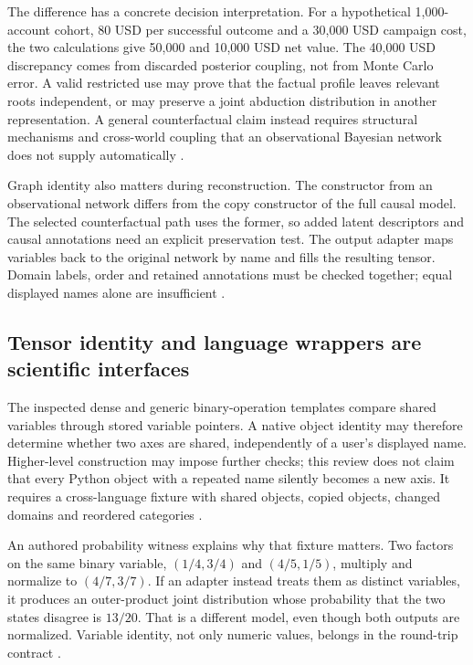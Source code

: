The difference has a concrete decision interpretation. For a hypothetical
1,000-account cohort, 80 USD per successful outcome and a 30,000 USD
campaign cost, the two calculations give 50,000 and 10,000 USD net value.
The 40,000 USD discrepancy comes from discarded posterior coupling, not
from Monte Carlo error. A valid restricted use may prove that the factual
profile leaves relevant roots independent, or may preserve a joint
abduction distribution in another representation. A general counterfactual
claim instead requires structural mechanisms and cross-world coupling that
an observational Bayesian network does not supply automatically
\cite{exec24_agrum_choice}.

Graph identity also matters during reconstruction. The constructor from an
observational network differs from the copy constructor of the full causal
model. The selected counterfactual path uses the former, so added latent
descriptors and causal annotations need an explicit preservation test.
The output adapter maps variables back to the original network by name and
fills the resulting tensor. Domain labels, order and retained annotations
must be checked together; equal displayed names alone are insufficient
\cite{exec24_agrum_source}.

\subsection{Tensor identity and language wrappers are scientific interfaces}
The inspected dense and generic binary-operation templates compare shared
variables through stored variable pointers. A native object identity may
therefore determine whether two axes are shared, independently of a user's
displayed name. Higher-level construction may impose further checks; this
review does not claim that every Python object with a repeated name silently
becomes a new axis. It requires a cross-language fixture with shared objects,
copied objects, changed domains and reordered categories
\cite{exec24_agrum_source}.

An authored probability witness explains why that fixture matters. Two
factors on the same binary variable, $(1/4,3/4)$ and $(4/5,1/5)$, multiply
and normalize to $(4/7,3/7)$. If an adapter instead treats them as distinct
variables, it produces an outer-product joint distribution whose
probability that the two states disagree is $13/20$. That is a different
model, even though both outputs are normalized. Variable identity, not only
numeric values, belongs in the round-trip contract
\cite{exec24_agrum_choice}.

